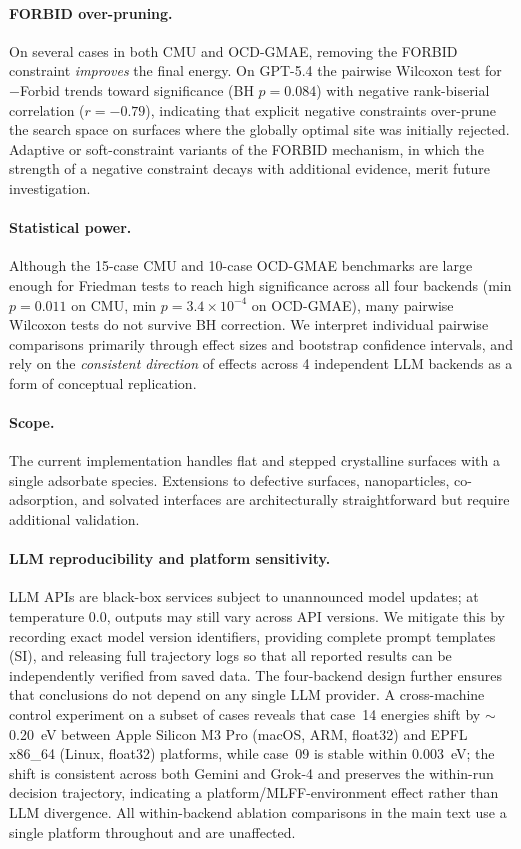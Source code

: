 \paragraph{FORBID over-pruning.}
On several cases in both CMU and OCD-GMAE, removing the FORBID constraint \textit{improves} the final energy.
On GPT-5.4 the pairwise Wilcoxon test for $-$Forbid trends toward significance (BH $p = 0.084$) with negative rank-biserial correlation ($r = -0.79$), indicating that explicit negative constraints over-prune the search space on surfaces where the globally optimal site was initially rejected.
Adaptive or soft-constraint variants of the FORBID mechanism, in which the strength of a negative constraint decays with additional evidence, merit future investigation.

\paragraph{Statistical power.}
Although the 15-case CMU and 10-case OCD-GMAE benchmarks are large enough for Friedman tests to reach high significance across all four backends (min $p = 0.011$ on CMU, min $p = 3.4\times 10^{-4}$ on OCD-GMAE), many pairwise Wilcoxon tests do not survive BH correction.
We interpret individual pairwise comparisons primarily through effect sizes and bootstrap confidence intervals, and rely on the \textit{consistent direction} of effects across 4 independent LLM backends as a form of conceptual replication.

\paragraph{Scope.}
The current implementation handles flat and stepped crystalline surfaces with a single adsorbate species.
Extensions to defective surfaces, nanoparticles, co-adsorption, and solvated interfaces are architecturally straightforward but require additional validation.

\paragraph{LLM reproducibility and platform sensitivity.}
LLM APIs are black-box services subject to unannounced model updates; at temperature 0.0, outputs may still vary across API versions.
We mitigate this by recording exact model version identifiers, providing complete prompt templates (SI), and releasing full trajectory logs so that all reported results can be independently verified from saved data.
The four-backend design further ensures that conclusions do not depend on any single LLM provider.
A cross-machine control experiment on a subset of cases reveals that case~14 energies shift by $\sim$0.20~eV between Apple Silicon M3 Pro (macOS, ARM, float32) and EPFL x86\_64 (Linux, float32) platforms, while case~09 is stable within 0.003~eV; the shift is consistent across both Gemini and Grok-4 and preserves the within-run decision trajectory, indicating a platform/MLFF-environment effect rather than LLM divergence.
All within-backend ablation comparisons in the main text use a single platform throughout and are unaffected.

